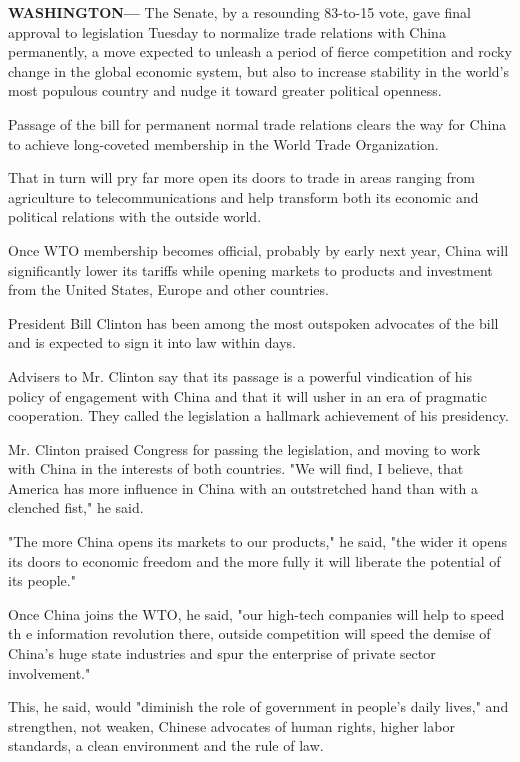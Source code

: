 \textbf{WASHINGTON---} The Senate, by a resounding 83-to-15 vote, gave
final approval to legislation Tuesday to normalize trade relations with
China permanently, a move expected to unleash a period of fierce
competition and rocky change in the global economic system, but also to
increase stability in the world's most populous country and nudge it
toward greater political openness.

Passage of the bill for permanent normal trade relations clears the way
for China to achieve long-coveted membership in the World Trade
Organization.

That in turn will pry far more open its doors to trade in areas ranging
from agriculture to telecommunications and help transform both its
economic and political relations with the outside world.

Once WTO membership becomes official, probably by early next year, China
will significantly lower its tariffs while opening markets to products
and investment from the United States, Europe and other countries.

President Bill Clinton has been among the most outspoken advocates of
the bill and is expected to sign it into law within days.

Advisers to Mr. Clinton say that its passage is a powerful vindication
of his policy of engagement with China and that it will usher in an era
of pragmatic cooperation. They called the legislation a hallmark
achievement of his presidency.

Mr. Clinton praised Congress for passing the legislation, and moving to
work with China in the interests of both countries. "We will find, I
believe, that America has more influence in China with an outstretched
hand than with a clenched fist," he said.

"The more China opens its markets to our products," he said, "the wider
it opens its doors to economic freedom and the more fully it will
liberate the potential of its people."

Once China joins the WTO, he said, "our high-tech companies will help to
speed th e information revolution there, outside competition will speed
the demise of China's huge state industries and spur the enterprise of
private sector involvement."

This, he said, would "diminish the role of government in people's daily
lives," and strengthen, not weaken, Chinese advocates of human rights,
higher labor standards, a clean environment and the rule of law.

